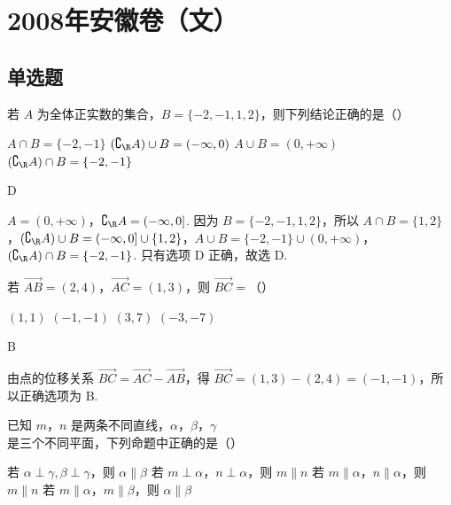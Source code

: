 \chapter{2008年安徽卷（文）}

\section{单选题}

\begin{problem}
若 \(A\) 为全体正实数的集合，\(B = \{-2, -1, 1, 2\}\)，则下列结论正确的是（\quad）

\choices
    {\(A \cap B = \{-2, -1\}\)}
    {\((\complement_{\R}A) \cup B = (-\infty, 0)\)}
    {\(A \cup B = (0, +\infty)\)}
    {\((\complement_{\R}A)\cap B = \{-2, -1\}\)}
\end{problem}

\begin{answer}
D
\end{answer}

\begin{solution}
\(A=(0,+\infty)\)，\(\complement_{\R}A=(-\infty,0]\). 因为 \(B=\{-2,-1,1,2\}\)，所以 \(A\cap B=\{1,2\}\)，\((\complement_{\R}A)\cup B=(-\infty,0]\cup\{1,2\}\)，\(A\cup B=\{-2,-1\}\cup(0,+\infty)\)，\((\complement_{\R}A)\cap B=\{-2,-1\}\). 只有选项 D 正确，故选 D.
\end{solution}

\begin{problem}
若 \(\overrightarrow{AB} = (2, 4)\)，\(\overrightarrow{AC} = (1, 3)\)，则 \(\overrightarrow{BC} =\)（\quad）

\choices
    {\((1,1)\)}
    {\((-1, - 1)\)}
    {\((3,7)\)}
    {\((-3, - 7)\)}
\end{problem}

\begin{answer}
B
\end{answer}

\begin{solution}
由点的位移关系 \(\overrightarrow{BC}=\overrightarrow{AC}-\overrightarrow{AB}\)，得 \(\overrightarrow{BC}=(1,3)-(2,4)=(-1,-1)\)，所以正确选项为 B.
\end{solution}

\begin{problem}
已知 \(m\)，\(n\) 是两条不同直线，\(\alpha\)，\(\beta\)，\(\gamma\) 是三个不同平面，下列命题中正确的是（\quad）

\choices
    {若 \(\alpha \perp \gamma, \beta \perp \gamma\)，则 \(\alpha \parallel \beta\)}
    {若 \(m \perp \alpha\)，\(n \perp \alpha\)，则 \(m \parallel n\)}
    {若 \(m \parallel \alpha\)，\(n \parallel \alpha\)，则 \(m \parallel n\)}
    {若 \(m \parallel \alpha\)，\(m \parallel \beta\)，则 \(\alpha \parallel \beta\)}
\end{problem}

